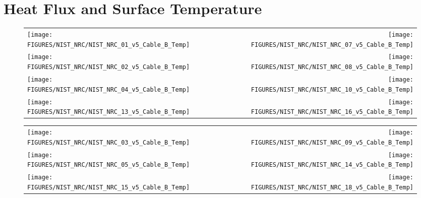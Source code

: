 \chapter{Heat Flux and Surface Temperature}



\begin{figure}[h!]
\begin{tabular*}{\textwidth}{l@{\extracolsep{\fill}}r}
\texttt{[image: FIGURES/NIST\_NRC/NIST\_NRC\_01\_v5\_Cable\_B\_Temp]} &
\texttt{[image: FIGURES/NIST\_NRC/NIST\_NRC\_07\_v5\_Cable\_B\_Temp]} \\
\texttt{[image: FIGURES/NIST\_NRC/NIST\_NRC\_02\_v5\_Cable\_B\_Temp]} &
\texttt{[image: FIGURES/NIST\_NRC/NIST\_NRC\_08\_v5\_Cable\_B\_Temp]} \\
\texttt{[image: FIGURES/NIST\_NRC/NIST\_NRC\_04\_v5\_Cable\_B\_Temp]} &
\texttt{[image: FIGURES/NIST\_NRC/NIST\_NRC\_10\_v5\_Cable\_B\_Temp]} \\
\texttt{[image: FIGURES/NIST\_NRC/NIST\_NRC\_13\_v5\_Cable\_B\_Temp]} &
\texttt{[image: FIGURES/NIST\_NRC/NIST\_NRC\_16\_v5\_Cable\_B\_Temp]}
\end{tabular*}
\label{NIST_NRC_Cable_B_Closed}
\end{figure}

\begin{figure}[h!]
\begin{tabular*}{\textwidth}{l@{\extracolsep{\fill}}r}
\texttt{[image: FIGURES/NIST\_NRC/NIST\_NRC\_03\_v5\_Cable\_B\_Temp]} &
\texttt{[image: FIGURES/NIST\_NRC/NIST\_NRC\_09\_v5\_Cable\_B\_Temp]} \\
\texttt{[image: FIGURES/NIST\_NRC/NIST\_NRC\_05\_v5\_Cable\_B\_Temp]} &
\texttt{[image: FIGURES/NIST\_NRC/NIST\_NRC\_14\_v5\_Cable\_B\_Temp]} \\
\texttt{[image: FIGURES/NIST\_NRC/NIST\_NRC\_15\_v5\_Cable\_B\_Temp]} &
\texttt{[image: FIGURES/NIST\_NRC/NIST\_NRC\_18\_v5\_Cable\_B\_Temp]}
\end{tabular*}
\label{NIST_NRC_Cable_B_Open}
\end{figure}


